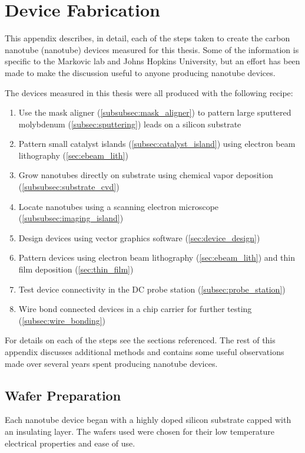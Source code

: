 \chapter{Device Fabrication}
\label{chap:fabrication}

This appendix describes, in detail, each of the steps taken to create the carbon nanotube (nanotube) devices measured for this thesis. Some of the information is specific to the Markovic lab and Johns Hopkins University, but an effort has been made to make the discussion useful to anyone producing nanotube devices.

The devices measured in this thesis were all produced with the following recipe:

\begin{enumerate}
\item Use the mask aligner (\ref{subsubsec:mask_aligner}) to pattern large sputtered molybdenum (\ref{subsec:sputtering}) leads on a silicon substrate
\item Pattern small catalyst islands (\ref{subsec:catalyst_island}) using electron beam lithography (\ref{sec:ebeam_lith})
\item Grow nanotubes directly on substrate using chemical vapor deposition (\ref{subsubsec:substrate_cvd})
\item Locate nanotubes using a scanning electron microscope (\ref{subsubsec:imaging_island})
\item Design devices using vector graphics software (\ref{sec:device_design})
\item Pattern devices using electron beam lithography (\ref{sec:ebeam_lith}) and thin film deposition (\ref{sec:thin_film})
\item Test device connectivity in the DC probe station (\ref{subsec:probe_station})
\item Wire bond connected devices in a chip carrier for further testing (\ref{subsec:wire_bonding})
\end{enumerate}

For details on each of the steps see the sections referenced. The rest of this appendix discusses additional methods and contains some useful observations made over several years spent producing nanotube devices.

\section{Wafer Preparation}

Each nanotube device began with a highly doped silicon substrate capped with an insulating layer. The wafers used were chosen for their low temperature electrical properties and ease of use.


